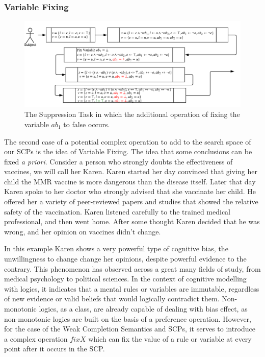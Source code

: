 \documentclass{article}
\begin{document}
\subsubsection*{Variable Fixing}

\begin{figure}
\begin{center}
\includegraphics[scale=0.7]{suppressionSCP_mod2}
\end{center}

\caption{The Suppression Task in which the additional operation of fixing the variable $ab_1$ to false occurs.}
\label{fig:supmod2}
\end{figure}

The second case of a potential complex operation to add to the search space of our SCPs is the idea of Variable Fixing. The idea that some  conclusions can be fixed \textit{a priori}. Consider a person who strongly doubts the effectiveness of vaccines, we will call her Karen. Karen started her day convinced that giving her child the MMR vaccine is more dangerous than the disease itself. Later that day Karen spoke to her doctor who strongly advised that she vaccinate her child. He offered her a variety of peer-reviewed papers and studies that showed the relative safety of the vaccination. Karen listened carefully to the trained medical professional, and then went home. After some thought Karen decided that he was wrong, and her opinion on vaccines didn't change.

In this example Karen shows a very powerful type of cognitive bias, the unwillingness to change change her opinions, despite powerful evidence to the contrary. This phenomenon has observed across a great many fields of study, from medical psychology \citep{brown2010omission} \citep{wroe2005feeling} to political sciences\citep{tappin2017heart}. In the context of cognitive modelling with logics, it indicates that a mental rules or variables are immutable, regardless of new evidence or valid beliefs that would logically contradict them. Non-monotonic logics, as a class, are already capable of dealing with bias effect, as non-monotonic logics are built on the basis of a preference operation. However, for the case of the Weak Completion Semantics and SCPs, it serves to introduce a complex operation $fixX$ which can fix the value of a rule or variable at every point after it occurs in the SCP.
\end{document}
